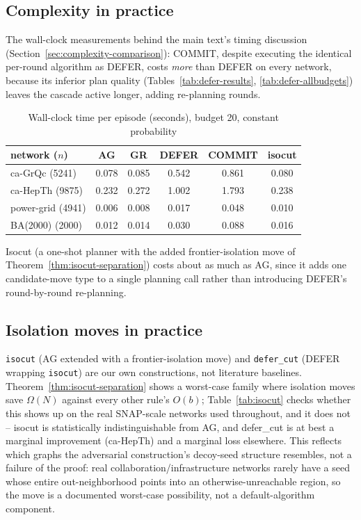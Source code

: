 \documentclass[ASNA,number]{USG}
\newcommand{\up}{\rule{0pt}{2.6ex}}
\newcommand{\down}{\rule[-1.2ex]{0pt}{0pt}}
\begin{document}
\subsection{Complexity in practice}\label{sec:complexity-practice}

The wall-clock measurements behind the main text's timing discussion
(Section~\ref{sec:complexity-comparison}): COMMIT, despite executing the
identical per-round algorithm as DEFER, costs \emph{more} than DEFER on
every network, because its inferior plan quality
(Tables~\ref{tab:defer-results}, \ref{tab:defer-allbudgets}) leaves the
cascade active longer, adding re-planning rounds.

\begin{table}[h]
\centering
\caption{Wall-clock time per episode (seconds), budget 20, constant probability\label{tab:timing}}
\begin{tabular}{@{}lccccc@{}}
\hline
\up network ($n$) & AG & GR & DEFER & COMMIT & isocut \\
\hline
\up ca-GrQc (5241) & 0.078 & 0.085 & 0.542 & 0.861 & 0.080 \\
ca-HepTh (9875) & 0.232 & 0.272 & 1.002 & 1.793 & 0.238 \\
power-grid (4941) & 0.006 & 0.008 & 0.017 & 0.048 & 0.010 \\
\down BA(2000) (2000) & 0.012 & 0.014 & 0.030 & 0.088 & 0.016 \\
\hline
\end{tabular}
Isocut (a one-shot planner with the added frontier-isolation move of
Theorem~\ref{thm:isocut-separation}) costs about as much as AG, since it
adds one candidate-move type to a single planning call rather than
introducing DEFER's round-by-round re-planning.
\end{table}

\subsection{Isolation moves in practice}\label{sec:isocut-practice}

\texttt{isocut} (AG extended with a frontier-isolation move) and
\texttt{defer\_cut} (DEFER wrapping \texttt{isocut}) are our own
constructions, not literature baselines. Theorem~\ref{thm:isocut-separation}
shows a worst-case family where isolation moves save $\Omega(N)$ against
every other rule's $O(b)$; Table~\ref{tab:isocut} checks whether this
shows up on the real SNAP-scale networks used throughout, and it does
not -- isocut is statistically indistinguishable from AG, and
defer\_cut is at best a marginal improvement (ca-HepTh) and a marginal
loss elsewhere. This reflects which graphs the adversarial construction's
decoy-seed structure resembles, not a failure of the proof: real
collaboration/infrastructure networks rarely have a seed whose entire
out-neighborhood points into an otherwise-unreachable region, so the move
is a documented worst-case possibility, not a default-algorithm
component.
\end{document}
